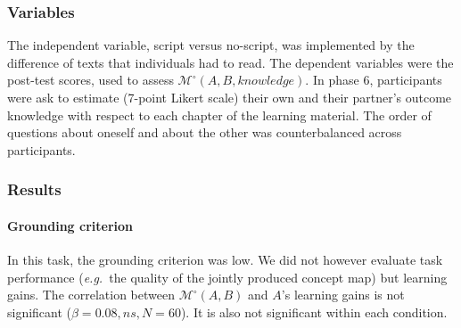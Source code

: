 \documentclass[natbib]{svjour3}
\newcommand{\eg}{{\textit{e.g.\ }}}
\newcommand{\M}[3]{{\mathcal{M}(#1, #2, #3)}}
\newcommand{\Model}[3]{{$\mathcal{M}^{\circ}(#1, #2, #3)$}}
\newcommand{\gModel}[2]{{$\mathcal{M}^{\circ}(#1, #2)$}}
\newcommand{\Mdeg}[3]{{\mathcal{M}^{\circ}(#1, #2, #3)}}
\begin{document}
\subsubsection*{Variables}

The independent variable, script versus no-script, was implemented by the
difference of texts that individuals had to read.  The dependent variables were
the post-test scores, used to assess \Model{A}{B}{knowledge}. In phase 6,
participants were ask to estimate (7-point Likert scale) their own and their
partner's outcome knowledge with respect to each chapter of the learning
material. The order of questions about oneself and about the other was
counterbalanced across participants. 
%
%
%

\subsubsection*{Results}

\paragraph{Grounding criterion} In this task, the grounding criterion was low.
We did not however evaluate task performance (\eg the quality of the jointly
produced concept map) but learning gains. The correlation between \gModel{A}{B}
and $A$'s learning gains is not significant ($\beta = 0.08, ns, N = 60$). It is
also not significant within each condition.
\end{document}
